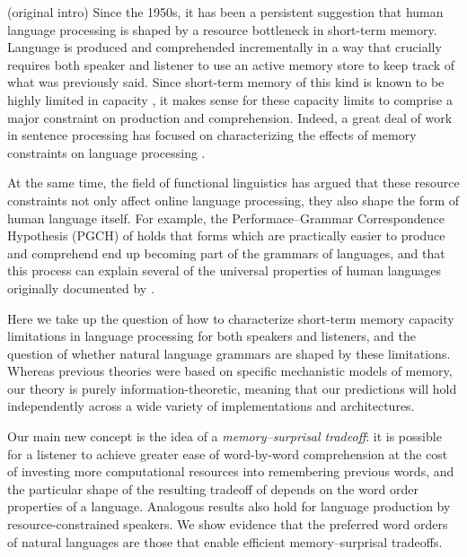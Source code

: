 \documentclass[11pt,letterpaper]{article}
\newcommand\mhahn[1]{{\color{red}(#1)}}
\begin{document}
\mhahn{original intro}
Since the 1950s, it has been a persistent suggestion that human language processing is shaped by a resource bottleneck in short-term memory.
Language is produced and comprehended incrementally in a way that crucially requires both speaker and listener to use an active memory store to keep track of what was previously said.
Since short-term memory of this kind is known to be highly limited in capacity \citep{miller1956magical}, it makes sense for these capacity limits to comprise a major constraint on production and comprehension.
Indeed, a great deal of work in sentence processing has focused on characterizing the effects of memory constraints on language processing \citep{gibson-linguistic-1998,lewis-activation-based-2005,levy2013memory}.

At the same time, the field of functional linguistics has argued that these resource constraints not only affect online language processing, they also shape the form of human language itself.
For example, the Performace--Grammar Correspondence Hypothesis (PGCH) of \citet{hawkins1994performance} holds that forms which are practically easier to produce and comprehend end up becoming part of the grammars of languages, and that this process can explain several of the universal properties of human languages originally documented by \citet{greenberg-universals-1963}.

Here we take up the question of how to characterize short-term memory capacity limitations in language processing for both speakers and listeners, and the question of whether natural language grammars are shaped by these limitations.
Whereas previous theories were based on specific mechanistic models of memory, our theory is purely information-theoretic, meaning that our predictions will hold independently across a wide variety of implementations and architectures.

Our main new concept is the idea of a \emph{memory--surprisal tradeoff}: it is possible for a listener to achieve greater ease of word-by-word comprehension at the cost of investing more computational resources into remembering previous words, and the particular shape of the resulting tradeoff of depends on the word order properties of a language. Analogous results also hold for language production by resource-constrained speakers. We show evidence that the preferred word orders of natural languages are those that enable efficient memory--surprisal tradeoffs.
\end{document}
